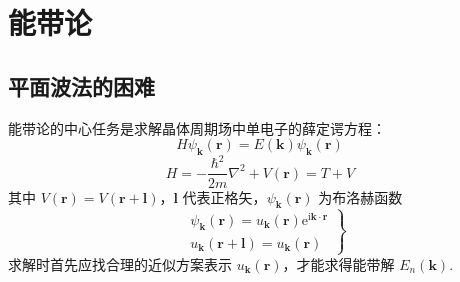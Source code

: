 \chapter{能带论}

\section{平面波法的困难}

能带论的中心任务是求解晶体周期场中单电子的薛定谔方程：
\begin{equation*}
  H\psi_{\boldsymbol{k}}(\boldsymbol{r})=E(\boldsymbol{k})\psi_{\boldsymbol{k}}(\boldsymbol{r})
\end{equation*}
\begin{equation}
  H=-\frac{\hbar^{2}}{2m}\nabla^{2}+V(\boldsymbol{r})=T+V
\end{equation}
其中 $V(\boldsymbol{r})=V(\boldsymbol{r}+\boldsymbol{l})$，$\boldsymbol{l}$ 代表正格矢，$\psi_{\boldsymbol{k}}(\boldsymbol{r})$ 为布洛赫函数
\begin{equation}
  \left.
  \begin{aligned}
    &\psi_{\boldsymbol{k}}(\boldsymbol{r})=u_{\boldsymbol{k}}(\boldsymbol{r})\mathrm{e}^{\mathrm{i}\boldsymbol{k}\cdot\boldsymbol{r}}\\
    &u_{\boldsymbol{k}}(\boldsymbol{r}+\boldsymbol{l})=u_{\boldsymbol{k}}(\boldsymbol{r})
  \end{aligned}\right\}
\end{equation}
求解时首先应找合理的近似方案表示 $u_{\boldsymbol{k}}(\boldsymbol{r})$，才能求得能带解 $E_{n}(\boldsymbol{k})$.

